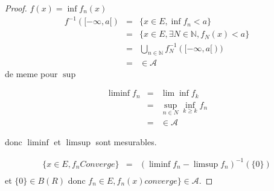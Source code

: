 \begin{proof}
	$f(x) = \inf f_n (x)$
	\begin{eqnarray*}
		f^{-1}([-\infty, a[) &=& \{x \in E, \inf f_n < a\} \\
		&=& \{x \in E, \exists N \in \mathbb{N}, f_N (x) < a \}\\
		&=& \bigcup\limits_{n\in \mathbb{N}}f_N^{-1}([-\infty, a[))\\
		&=& \in \mathscr{A}
	\end{eqnarray*}
	de meme pour $\sup$

	\begin{eqnarray*}
        \liminf f_n &=& \lim \inf f_k\\ %
		&=& \sup _{n\in N} \inf_{k \geq k} f_n\\
		&=& \in \mathscr{A}
	\end{eqnarray*}

	donc $\liminf$ et $\limsup$ sont mesurables.

	\begin{eqnarray*}
		\{x \in E, f_n Converge \}  &=& (\liminf f_n - \limsup f_n)^{-1}(\{0\}) \\
	\end{eqnarray*}
	et $\{ 0 \} \in B(R)$ donc $f_n \in E, f_n(x) converge \} \in \mathscr{A}$.
\end{proof}

